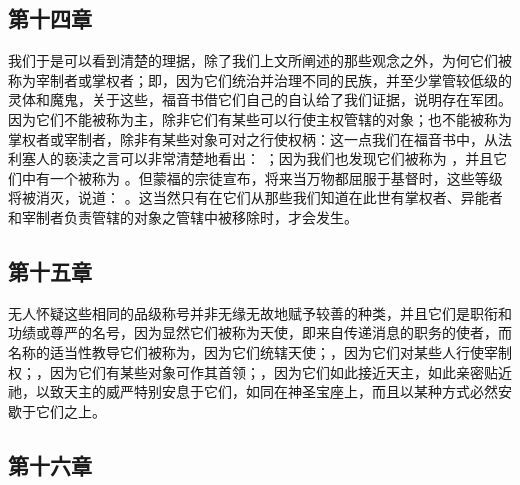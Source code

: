 
\subsection{第十四章}

\par

我们于是可以看到清楚的理据，除了我们上文所阐述的那些观念之外，为何它们被称为宰制者或掌权者；即，因为它们统治并治理不同的民族，并至少掌管较低级的灵体和魔鬼，关于这些，福音书借它们自己的自认给了我们证据，说明存在军团。因为它们不能被称为主，除非它们有某些可以行使主权管辖的对象；也不能被称为掌权者或宰制者，除非有某些对象可对之行使权柄：这一点我们在福音书中，从法利塞人的亵渎之言可以非常清楚地看出： ；因为我们也发现它们被称为 ，并且它们中有一个被称为 。但蒙福的宗徒宣布，将来当万物都屈服于基督时，这些等级将被消灭，说道： 。这当然只有在它们从那些我们知道在此世有掌权者、异能者和宰制者负责管辖的对象之管辖中被移除时，才会发生。\par


\subsection{第十五章}

\par

无人怀疑这些相同的品级称号并非无缘无故地赋予较善的种类，并且它们是职衔和功绩或尊严的名号，因为显然它们被称为天使，即来自传递消息的职务的使者，而名称的适当性教导它们被称为，因为它们统辖天使；，因为它们对某些人行使宰制权；，因为它们有某些对象可作其首领；，因为它们如此接近天主，如此亲密贴近祂，以致天主的威严特别安息于它们，如同在神圣宝座上，而且以某种方式必然安歇于它们之上。\par


\subsection{第十六章}

